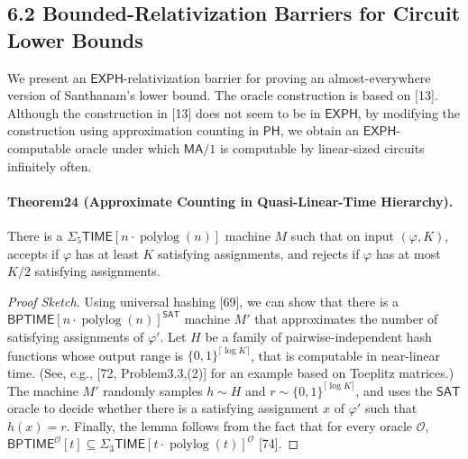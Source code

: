 \subsection*{6.2 Bounded-Relativization Barriers for Circuit Lower Bounds}
We present an $\mathsf{EXPH}$-relativization barrier for proving an almost-everywhere version of Santhanam's lower bound. The oracle construction is based on [13]. Although the construction in [13] does not seem to be in $\mathsf{EXPH}$, by modifying the construction using approximation counting in $\mathsf{PH}$, we obtain an $\mathsf{EXPH}$-computable oracle under which $\mathsf{MA}/1$ is computable by linear-sized circuits infinitely often.
\paragraph{Theorem24 (Approximate Counting in Quasi-Linear-Time Hierarchy).} There is a $\Sigma_5\mathsf{TIME}[n\cdot\operatorname{polylog}(n)]$ machine $M$ such that on input $(\varphi,K)$, accepts if $\varphi$ has at least $K$ satisfying assignments, and rejects if $\varphi$ has at most $K/2$ satisfying assignments.
\begin{proof}[Proof Sketch]
Using universal hashing [69], we can show that there is a $\mathsf{BPTIME}[n\cdot\operatorname{polylog}(n)]^{\mathsf{SAT}}$ machine $M'$ that approximates the number of satisfying assignments of $\varphi'$. Let $H$ be a family of pairwise-independent hash functions whose output range is $\{0,1\}^{\lceil\log K\rceil}$, that is computable in near-linear time. (See, e.g., [72, Problem3.3,(2)] for an example based on Toeplitz matrices.) The machine $M'$ randomly samples $h\sim H$ and $r\sim\{0,1\}^{\lceil\log K\rceil}$, and uses the $\mathsf{SAT}$ oracle to decide whether there is a satisfying assignment $x$ of $\varphi'$ such that $h(x)=r$.
Finally, the lemma follows from the fact that for every oracle $\mathcal O$, $\mathsf{BPTIME}^{\mathcal O}[t]\subseteq\Sigma_3\mathsf{TIME}[t\cdot\operatorname{polylog}(t)]^{\mathcal O}$ [74].
\end{proof}
